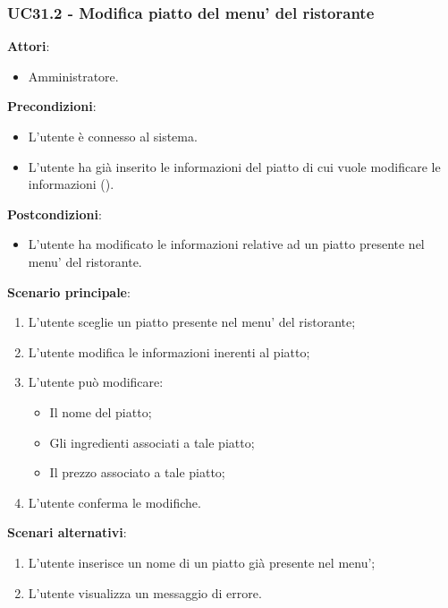 \subsubsection{UC31.2 - Modifica piatto del menu' del ristorante}\label{usecase:31_2}
\textbf{Attori}:
\begin{itemize}
    \item Amministratore.
\end{itemize}
\textbf{Precondizioni}:
\begin{itemize}
    \item L'utente è connesso al sistema.
    \item L'utente ha già inserito le informazioni del piatto di cui vuole modificare le informazioni ().
\end{itemize}
\textbf{Postcondizioni}:
\begin{itemize}
    \item L'utente ha modificato le informazioni relative ad un piatto presente nel menu' del ristorante.
\end{itemize}
\textbf{Scenario principale}:
\begin{enumerate}
    \item L'utente sceglie un piatto presente nel menu' del ristorante;
    \item L'utente modifica le informazioni inerenti al piatto;
    \item L'utente può modificare:
    \begin{itemize}
        \item Il nome del piatto;
        \item Gli ingredienti associati a tale piatto;
        \item Il prezzo associato a tale piatto;
    \end{itemize}
    \item L'utente conferma le modifiche.
\end{enumerate}
\textbf{Scenari alternativi}:
\begin{enumerate}
    \item L’utente inserisce un nome di un piatto già presente nel menu’;
    \item L'utente visualizza un messaggio di errore.
\end{enumerate}